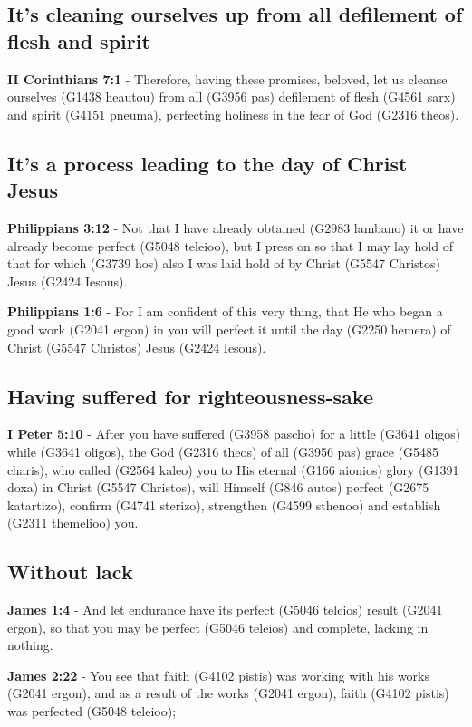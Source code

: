 \documentclass[11pt]{article}
\begin{document}
\subsection{It's cleaning ourselves up from all defilement of flesh and spirit}
\label{sec:org3e36e65}
\textbf{II Corinthians 7:1} - Therefore, having these promises, beloved, let us cleanse ourselves (G1438 heautou) from all (G3956 pas) defilement of flesh (G4561 sarx) and spirit (G4151 pneuma), perfecting holiness in the fear of God (G2316 theos).

\subsection{It's a process leading to the day of Christ Jesus}
\label{sec:org9d45167}
\textbf{Philippians 3:12} - Not that I have already obtained (G2983 lambano) it or have already become perfect (G5048 teleioo), but I press on so that I may lay hold of that for which (G3739 hos) also I was laid hold of by Christ (G5547 Christos) Jesus (G2424 Iesous).

\textbf{Philippians 1:6} - For I am confident of this very thing, that He who began a good work (G2041 ergon) in you will perfect it until the day (G2250 hemera) of Christ (G5547 Christos) Jesus (G2424 Iesous).

\subsection{Having suffered for righteousness-sake}
\label{sec:org4b90492}
\textbf{I Peter 5:10} - After you have suffered (G3958 pascho) for a little (G3641 oligos) while (G3641 oligos), the God (G2316 theos) of all (G3956 pas) grace (G5485 charis), who called (G2564 kaleo) you to His eternal (G166 aionios) glory (G1391 doxa) in Christ (G5547 Christos), will Himself (G846 autos) perfect (G2675 katartizo), confirm (G4741 sterizo), strengthen (G4599 sthenoo) and establish (G2311 themelioo) you.

\subsection{Without lack}
\label{sec:orgfda2796}
\textbf{James 1:4} - And let endurance have its perfect (G5046 teleios) result (G2041 ergon), so that you may be perfect (G5046 teleios) and complete, lacking in nothing.

\textbf{James 2:22} - You see that faith (G4102 pistis) was working with his works (G2041 ergon), and as a result of the works (G2041 ergon), faith (G4102 pistis) was perfected (G5048 teleioo);
\end{document}

